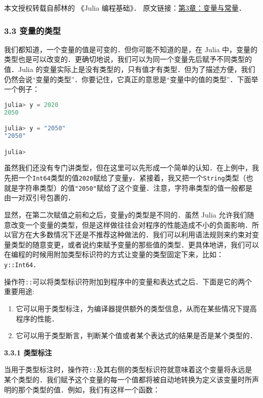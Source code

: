
本文授权转载自郝林的 《Julia 编程基础》． 原文链接：\href{https://github.com/hyper0x/JuliaBasics/blob/master/book/ch03.md}{第3章：变量与常量}．


\subsubsection{3.3 变量的类型}

我们都知道，一个变量的值是可变的．但你可能不知道的是，在 Julia 中，变量的类型也是可以改变的．更确切地说，我们可以为同一个变量先后赋予不同类型的值．Julia 的变量实际上是没有类型的，只有值才有类型．但为了描述方便，我们仍然会说“变量的类型”．你要记住，它真正的意思是“变量中的值的类型”．下面举一个例子：

\begin{lstlisting}[language=julia]
julia> y = 2020
2050

julia> y = "2050"
"2050"

julia> 
\end{lstlisting}

虽然我们还没有专门讲类型，但在这里可以先形成一个简单的认知．在上例中，我先把一个\verb|Int64|类型的值\verb|2020|赋给了变量\verb|y|．紧接着，我又把一个\verb|String|类型（也就是字符串类型）的值\verb|"2050"|赋给了这个变量．注意，字符串类型的值一般都是由一对双引号包裹的．

显然，在第二次赋值之前和之后，变量\verb|y|的类型是不同的．虽然 Julia 允许我们随意改变一个变量的类型，但是这样做往往会对程序的性能造成不小的负面影响．所以官方在大多数情况下还是不推荐这种做法的．我们可以利用语法规则来约束对变量类型的随意变更，或者说约束赋予变量的那些值的类型．更具体地讲，我们可以在编程的时候用附加类型标识符的方式让变量的类型固定下来，比如：\verb|y::Int64|．

操作符\verb|::|可以将类型标识符附加到程序中的变量和表达式之后．下面是它的两个重要用途:

\begin{enumerate}
\item 它可以用于类型标注，为编译器提供额外的类型信息，从而在某些情况下提高程序的性能．
\item 它可以用于类型断言，判断某个值或者某个表达式的结果是否是某个类型的．
\end{enumerate}

\textbf{3.3.1 类型标注}

当用于类型标注时，操作符\verb|::|及其右侧的类型标识符就意味着这个变量将永远是某个类型的．我们赋予这个变量的每一个值都将被自动地转换为定义该变量时所声明的那个类型的值．例如，我们有这样一个函数：

